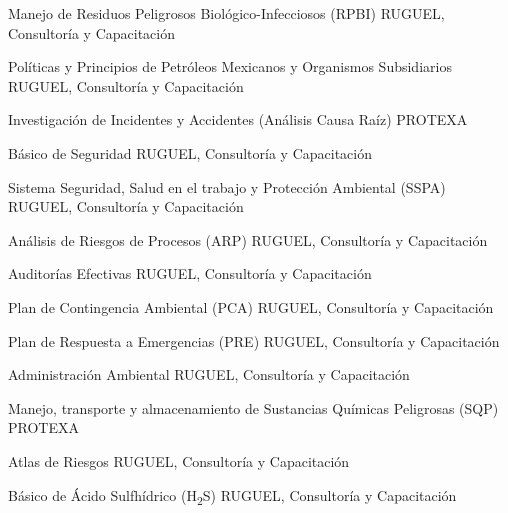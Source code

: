 \documentclass[11pt, letterpaper, roman]{moderncv}
\begin{document}
		{Manejo de Residuos Peligrosos Biológico-Infecciosos (RPBI)}
		{\newline RUGUEL, Consultoría y Capacitación}
		{}
		{}
		{}

		{Políticas y Principios de Petróleos Mexicanos y Organismos 
		Subsidiarios}
		{\newline RUGUEL, Consultoría y Capacitación}
		{}
		{}
		{}

		{Investigación de Incidentes y Accidentes (Análisis Causa Raíz)}
		{\newline PROTEXA}
		{}
		{}
		{}

		{Básico de Seguridad}
		{\newline RUGUEL, Consultoría y Capacitación}
		{}
		{}
		{}

		{Sistema Seguridad, Salud en el trabajo y Protección Ambiental (SSPA)}
		{\newline RUGUEL, Consultoría y Capacitación}
		{}
		{}
		{}

		{Análisis de Riesgos de Procesos (ARP)}
		{\newline RUGUEL, Consultoría y Capacitación}
		{}
		{}
		{}

		{Auditorías Efectivas}
		{\newline RUGUEL, Consultoría y Capacitación}
		{}
		{}
		{}

		{Plan de Contingencia Ambiental (PCA)}
		{\newline RUGUEL, Consultoría y Capacitación}
		{}
		{}
		{}

		{Plan de Respuesta a Emergencias (PRE)}
		{\newline RUGUEL, Consultoría y Capacitación}
		{}
		{}
		{}

		{Administración Ambiental}
		{\newline RUGUEL, Consultoría y Capacitación}
		{}
		{}
		{}
		
		{Manejo, transporte y almacenamiento de Sustancias Químicas Peligrosas 
		(SQP)}
		{\newline PROTEXA}
		{}
		{}
		{}
		
		{Atlas de Riesgos}
		{\newline RUGUEL, Consultoría y Capacitación}
		{}
		{}
		{}

		{Básico de Ácido Sulfhídrico (\texorpdfstring{H\textsubscript{2}S}{})}
		{\newline RUGUEL, Consultoría y Capacitación}
		{}
		{}
		{}
\end{document}
